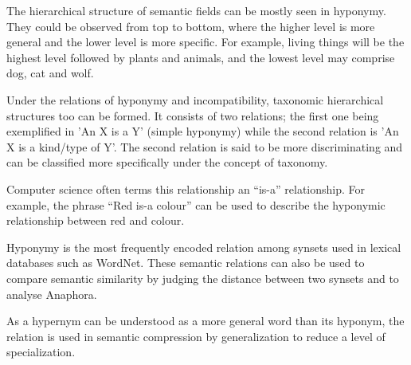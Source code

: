 The hierarchical structure of semantic fields can be mostly seen in hyponymy. They could be observed from top to bottom, where the higher level is more general and the lower level is more specific. For example, living things will be the highest level followed by plants and animals, and the lowest level may comprise dog, cat and wolf.

Under the relations of hyponymy and incompatibility, taxonomic hierarchical structures too can be formed. It consists of two relations; the first one being exemplified in 'An X is a Y' (simple hyponymy) while the second relation is 'An X is a kind/type of Y'. The second relation is said to be more discriminating and can be classified more specifically under the concept of taxonomy.

Computer science often terms this relationship an ``is-a'' relationship. For example, the phrase ``Red is-a colour'' can be used to describe the hyponymic relationship between red and colour.

Hyponymy is the most frequently encoded relation among synsets used in lexical databases such as WordNet. These semantic relations can also be used to compare semantic similarity by judging the distance between two synsets and to analyse Anaphora.

As a hypernym can be understood as a more general word than its hyponym, the relation is used in semantic compression by generalization to reduce a level of specialization.

%
%
%
%
%
%
